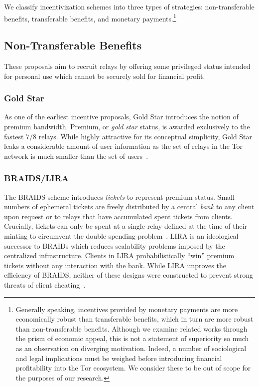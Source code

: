 We classify incentivization schemes into three types of strategies:
non-transferable benefits, transferable benefits, and monetary
payments.\footnote{Generally speaking, incentives provided by monetary payments
  are more economically robust than transferable benefits, which in turn are
  more robust than non-transferable benefits. Although we examine related works
  through the prism of economic appeal, this is not a statement of superiority
  so much as an observation on diverging motivation. Indeed, a number of
  sociological and legal implications must be weighed before
  introducing financial profitability into the Tor ecosystem. We consider these
  to be out of scope for the purposes of our research.}

\subsection{Non-Transferable Benefits}

These proposals aim to recruit relays by offering some privileged status
intended for personal use which cannot be securely sold for financial profit.

\subsubsection{Gold Star} As one of the earliest incentive proposals, Gold Star
introduces the notion of premium bandwidth. Premium, or \emph{gold star} status,
is awarded exclusively to the fastest 7/8 relays. While highly attractive
for its conceptual simplicity, Gold Star leaks a considerable amount of user
information as the set of relays in the Tor network is much smaller than the set
of users~\cite{dingledine2010building}.

\subsubsection{BRAIDS/LIRA} The BRAIDS scheme introduces \emph{tickets} to represent
premium status. Small numbers of ephemeral tickets are freely distributed by a
central \emph{bank} to any client upon request or to relays that have
accumulated spent tickets from clients. Crucially, tickets can only be spent at
a single relay defined at the time of their minting to circumvent the double
spending problem~\cite{jansen2010recruiting}. LIRA is an ideological successor
to BRAIDs which reduces scalability problems imposed by the centralized
infrastructure. Clients in LIRA probabilistically ``win'' premium tickets
without any interaction with the bank. While LIRA improves the efficiency of
BRAIDS, neither of these designs were constructed to prevent strong threats of
client cheating~\cite{jansen2013lira}.

